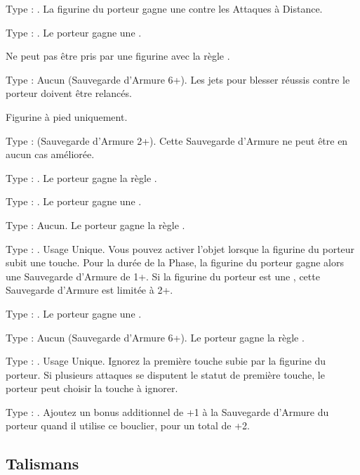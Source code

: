 \startpricelist

Type : \shield{}. La figurine du porteur gagne une  contre les Attaques à Distance.

Type : \ha{}. Le porteur gagne une .

Ne peut pas être pris par une figurine avec la règle \largetarget{}.

Type : Aucun (Sauvegarde d'Armure 6+). Les jets pour blesser réussis contre le porteur doivent être relancés.

Figurine à pied uniquement.

Type : \ha{} (Sauvegarde d'Armure 2+). Cette Sauvegarde d'Armure ne peut être en aucun cas améliorée.

Type : \ha{}. Le porteur gagne la règle \distracting{}.

Type : \ha{}. Le porteur gagne une .

Type : Aucun. Le porteur gagne la règle .

\columnbreak

Type : \ha{}. Usage Unique. Vous pouvez activer l'objet lorsque la figurine du porteur subit une touche. Pour la durée de la Phase, la figurine du porteur gagne alors une Sauvegarde d'Armure de 1+. Si la figurine du porteur est une \largetarget{}, cette Sauvegarde d'Armure est limitée à 2+.

Type : \ha{}. Le porteur gagne une .

Type : Aucun (Sauvegarde d'Armure 6+). Le porteur gagne la règle \fireborn{}.

Type : \shield{}. Usage Unique. Ignorez la première touche subie par la figurine du porteur. Si plusieurs attaques se disputent le statut de première touche, le porteur peut choisir la touche à ignorer.

Type : \shield{}. Ajoutez un bonus additionnel de +1 à la Sauvegarde d'Armure du porteur quand il utilise ce bouclier, pour un total de +2.

\endpricelist

\newpage
\hypertarget{talismans}{\subsection{Talismans}}
\label{talismans}

